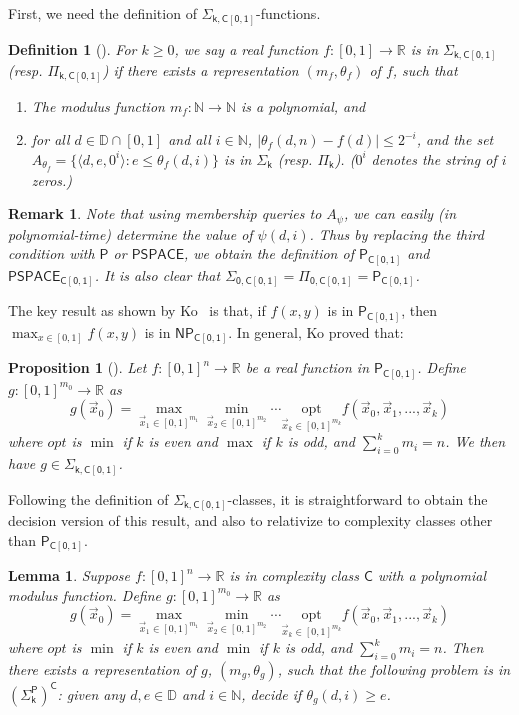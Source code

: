 \documentclass[conference]{IEEEtran}
\newtheorem{proposition}[theorem]{Proposition}
\newtheorem{definition}[theorem]{Definition}
\newtheorem{lemma}[theorem]{Lemma}
\newtheorem{remark}[theorem]{Remark}
\begin{document}
First, we need the definition of $\mathsf{\Sigma_{k,C[0,1]}}$-functions. 
\begin{definition}[\cite{Kobook}]
For $k\geq 0$, we say a real function $f:[0,1]\rightarrow \mathbb{R}$ is in $\mathsf{\Sigma_{k,C[0,1]}}$ (resp. $\mathsf{\Pi_{k,C[0,1]}}$) if there exists a representation $(m_f, \theta_f)$ of $f$, such that
\begin{enumerate}
\item The modulus function $m_f: \mathbb{N}\rightarrow \mathbb{N}$ is a polynomial, and
\item for all $d\in \mathbb{D}\cap [0,1]$ and all $i\in \mathbb{N}$, $|\theta_f(d, n)-f(d)|\leq 2^{-i}$, and the set $A_{\theta_f} = \{\langle d, e, 0^i\rangle: e\leq \theta_f(d, i)\}$ is in $\mathsf{\Sigma_k}$ (resp. $\mathsf{\Pi_k}$). ($0^i$ denotes the string of $i$ zeros.) 
\end{enumerate}
\end{definition}
\begin{remark}
Note that using membership queries to $A_{\psi}$, we can easily (in polynomial-time) determine the value of $\psi(d,i)$. Thus by replacing the third condition with $\mathsf{P}$ or $\mathsf{PSPACE}$, we obtain the definition of $\mathsf{P_{C[0,1]}}$ and $\mathsf{PSPACE_{C[0,1]}}$. It is also clear that $\mathsf{\Sigma_{0,C[0,1]}}=\mathsf{\Pi_{0,C[0,1]}}=\mathsf{P_{C[0,1]}}$.  
\end{remark}
The key result as shown by Ko~\cite{Kobook} is that, if $f(x,y)$ is in $\mathsf{P_{C[0,1]}}$, then $\max_{x\in [0,1]} f(x,y)$ is in $\mathsf{NP_{C[0,1]}}$. In general, Ko proved that: 
\begin{proposition}[\cite{Kobook}]
Let $f: [0,1]^n\rightarrow \mathbb{R}$ be a real function in $\mathsf{P_{C[0,1]}}$. Define $g: [0,1]^{m_0}\rightarrow \mathbb{R}$ as 
$$g(\vec x_0) = \max_{\vec x_1\in [0,1]^{m_1}}\min_{\vec x_2\in [0,1]^{m_2}}\cdots \underset{\vec x_k\in [0,1]^{m_k}}{\mbox{opt}} f(\vec x_0, \vec x_1, ..., \vec x_k)$$
where $opt$ is $\min$ if $k$ is even and $\max$ if $k$ is odd, and $\sum_{i=0}^k m_i = n$. We then have $g\in \mathsf{\Sigma_{k,C[0,1]}}$. 
\end{proposition}
Following the definition of $\mathsf{\Sigma_{k,C[0,1]}}$-classes, it is straightforward to obtain the decision version of this result, and also to relativize to complexity classes other than $\mathsf{P_{C[0,1]}}$. 
\begin{lemma}\label{lem}
Suppose $f: [0,1]^n\rightarrow\mathbb{R}$ is in complexity class $\mathsf{C}$ with a polynomial modulus function. Define $g: [0,1]^{m_0}\rightarrow \mathbb{R}$ as 
$$g(\vec x_0) = \max_{\vec x_1\in [0,1]^{m_1}}\min_{\vec x_2\in [0,1]^{m_2}}\cdots\underset{\vec x_k\in [0,1]^{m_k}}{\mbox{opt}}f(\vec x_0, \vec x_1, ..., \vec x_k)$$
where $opt$ is $\min$ if $k$ is even and $\min$ if $k$ is odd, and $\sum_{i=0}^k m_i = n$. Then there exists a representation of $g$, $(m_g, \theta_g)$, such that the following problem is in $\mathsf{(\Sigma_k^P)^C}$: given any $d,e\in \mathbb{D}$ and $i\in \mathbb{N}$, decide if $\theta_g(d, i)\geq e$. 
\end{lemma}
\end{document}
